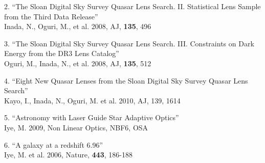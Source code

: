 \begin{publications}
2. ``The Sloan Digital Sky Survey Quasar Lens Search. II. Statistical Lens Sample from the Third Data Release''\\
\hspace*{0.4cm} Inada, N., Oguri, M., et al. 2008, 
AJ, {\bf 135}, 496

3. ``The Sloan Digital Sky Survey Quasar Lens Search. III. Constraints
   on Dark Energy from the DR3 Lens Catalog''\\
\hspace*{0.4cm} Oguri, M., Inada, N., et al. 2008, 
AJ, {\bf 135}, 512

4. ``Eight New Quasar Lenses from the Sloan Digital Sky Survey Quasar Lens
Search''\\
\hspace*{0.4cm} Kayo, I., Inada, N., Oguri, M. et al. 2010, 
AJ,  139, 1614 

5. ``Astronomy with Laser Guide Star Adaptive Optics''\\
\hspace*{0.4cm} Iye, M. 2009, Non Linear Optics, NBF6, OSA

6. ``A galaxy at a redshift 6.96''\\
\hspace*{0.4cm} Iye, M. et al. 2006, Nature, {\bf 443}, 186-188
\end{publications}


%
%
\begin{observingrun}
\run{}{}{}{}{}{}


\end{observingrun}

